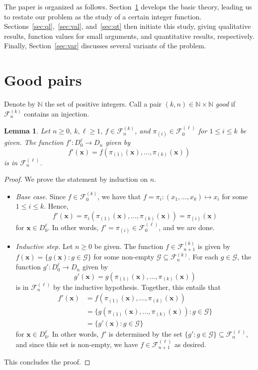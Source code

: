 \documentclass[a4paper,12pt]{article}
\newtheorem{lemma}[theorem]{Lemma}
\theoremstyle{definition}
\theoremstyle{remark}
\newcommand{\fset}[2]{\mathcal F^{(#1)}_{#2}}
\newcommand{\N}{\mathbb N}
\begin{document}
The paper is organized as follows. Section~\ref{sec:gp} develops the basic theory, leading us to restate our problem as the study of a certain integer function. Sections~\ref{sec:ql},~\ref{sec:val}, and~\ref{sec:qt} then initiate this study, giving qualitative results, function values for small arguments, and quantitative results, respectively. Finally, Section~\ref{sec:var} discusses several variants of the problem.

\section{Good pairs}\label{sec:gp}

Denote by $\N$ the set of positive integers. Call a pair $(k, n) \in \N \times \N$ \emph{good} if $\fset kn$ contains an injection.

\begin{lemma}\label{lem:var}
    Let $n \geq 0$, $k, \ell \geq 1$, $f \in \fset kn$, and $\pi_{(i)} \in \fset \ell0$ for $1 \leq i \leq k$ be given. The function $f' : D_0^\ell \to D_n$ given by
    \[f'(\mathbf x) = f(\pi_{(1)}(\mathbf x), \dots, \pi_{(k)}(\mathbf x))\]
    is in $\fset \ell n$.
\end{lemma}
\begin{proof}
    We prove the statement by induction on $n$.
    \begin{itemize}
        \item \textit{Base case.} Since $f \in \fset k0$, we have that $f = \pi_i : (x_1, \dots, x_k) \mapsto x_i$ for some $1 \leq i \leq k$. Hence,
        \[f'(\mathbf x) = \pi_i(\pi_{(1)}(\mathbf x), \dots, \pi_{(k)}(\mathbf x)) = \pi_{(i)}(\mathbf x)\]
        for $\mathbf x \in D_0^\ell$. In other words, $f' = \pi_{(i)} \in \fset \ell0$, and we are done.
        \item \textit{Inductive step.} Let $n \geq 0$ be given. The function $f \in \fset k{n+1}$ is given by $f(\mathbf x) = \{g(\mathbf x) : g \in \mathcal G\}$ for some non-empty $\mathcal G \subseteq \fset kn$. For each $g \in \mathcal G$, the function $g' : D_0^\ell \to D_n$ given by
        \[g'(\mathbf x) = g(\pi_{(1)}(\mathbf x), \dots, \pi_{(k)}(\mathbf x))\]
        is in $\fset \ell n$ by the inductive hypothesis. Together, this entails that
        \begin{align*}
            f'(\mathbf x) &= f(\pi_{(1)}(\mathbf x), \dots, \pi_{(k)}(\mathbf x))\\
            &= \{g(\pi_{(1)}(\mathbf x), \dots, \pi_{(k)}(\mathbf x)) : g \in \mathcal G\}\\
            &= \{g'(\mathbf x) : g \in \mathcal G\}
        \end{align*}
        for $\mathbf x \in D_0^\ell$. In other words, $f'$ is determined by the set $\{g' : g \in \mathcal G\} \subseteq \fset \ell n$, and since this set is non-empty, we have $f \in \fset \ell{n+1}$ as desired.
    \end{itemize}
    This concludes the proof.
\end{proof}
\end{document}
